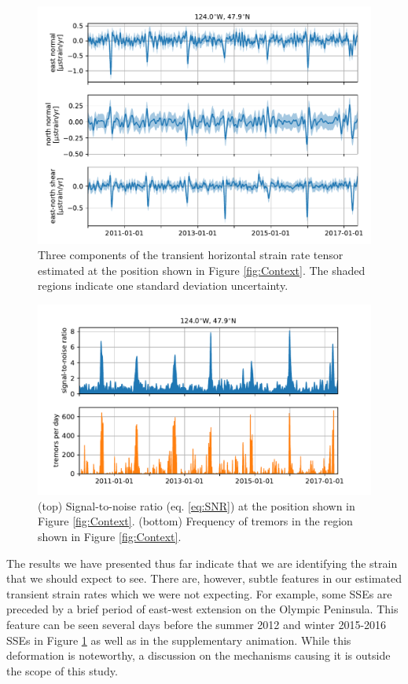 \documentclass[extra,mreferee]{gji}
\begin{document}
\begin{figure}
\includegraphics{figures/strain_ts/strain-ts.pdf}
\caption{Three components of the transient horizontal strain rate tensor estimated at the position shown in Figure \ref{fig:Context}. The shaded regions indicate one standard deviation uncertainty.}   
\label{fig:StrainTs}
\end{figure}

\begin{figure}
\includegraphics{figures/strain_ts/mag-ts.pdf}
\caption{(top) Signal-to-noise ratio (eq. \ref{eq:SNR}) at the position shown in Figure \ref{fig:Context}. (bottom) Frequency of tremors in the region shown in Figure \ref{fig:Context}.}   
\label{fig:StrainMag}
\end{figure}

The results we have presented thus far indicate that we are identifying the strain that we should expect to see. There are, however, subtle features in our estimated transient strain rates which we were not expecting. For example, some SSEs are preceded by a brief period of east-west extension on the Olympic Peninsula. This feature can be seen several days before the summer 2012 and winter 2015-2016 SSEs in Figure \ref{fig:StrainTs} as well as in the supplementary animation. While this deformation is noteworthy, a discussion on the mechanisms causing it is outside the scope of this study.
\end{document}
